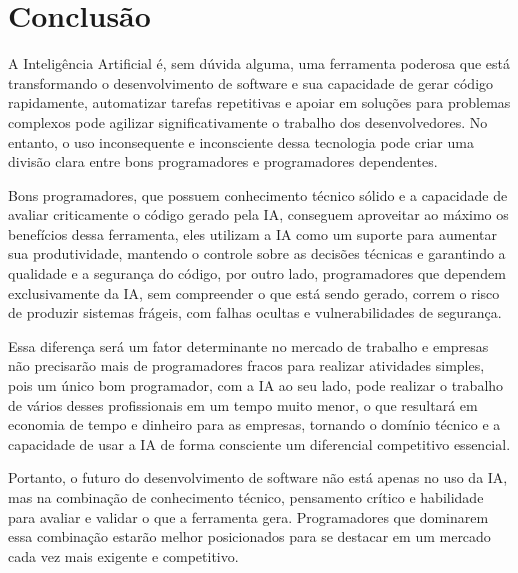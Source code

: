 \documentclass[12pt]{article}
\begin{document}
\section{Conclusão}

A Inteligência Artificial é, sem dúvida alguma, uma ferramenta poderosa que está transformando o desenvolvimento de software e sua capacidade de gerar código rapidamente, automatizar tarefas repetitivas e apoiar em soluções para problemas complexos pode agilizar significativamente o trabalho dos desenvolvedores. No entanto, o uso inconsequente e inconsciente dessa tecnologia pode criar uma divisão clara entre bons programadores e programadores dependentes.

Bons programadores, que possuem conhecimento técnico sólido e a capacidade de avaliar criticamente o código gerado pela IA, conseguem aproveitar ao máximo os benefícios dessa ferramenta, eles utilizam a IA como um suporte para aumentar sua produtividade, mantendo o controle sobre as decisões técnicas e garantindo a qualidade e a segurança do código, por outro lado, programadores que dependem exclusivamente da IA, sem compreender o que está sendo gerado, correm o risco de produzir sistemas frágeis, com falhas ocultas e vulnerabilidades de segurança.

Essa diferença será um fator determinante no mercado de trabalho e empresas não precisarão mais de programadores fracos para realizar atividades simples, pois um único bom programador, com a IA ao seu lado, pode realizar o trabalho de vários desses profissionais em um tempo muito menor, o que resultará em economia de tempo e dinheiro para as empresas, tornando o domínio técnico e a capacidade de usar a IA de forma consciente um diferencial competitivo essencial.

Portanto, o futuro do desenvolvimento de software não está apenas no uso da IA, mas na combinação de conhecimento técnico, pensamento crítico e habilidade para avaliar e validar o que a ferramenta gera. Programadores que dominarem essa combinação estarão melhor posicionados para se destacar em um mercado cada vez mais exigente e competitivo.
\end{document}
